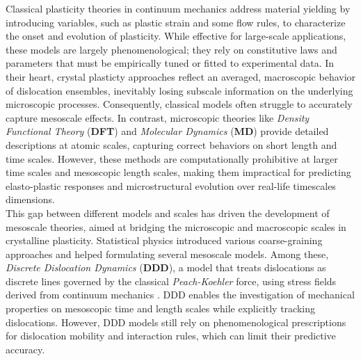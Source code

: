 \documentclass[11pt]{article}
\begin{document}
Classical plasticity theories in continuum mechanics address material yielding by introducing variables, such as plastic strain and some flow rules, to characterize the onset and evolution of plasticity. While effective for large-scale applications, these models are largely phenomenological; they rely on constitutive laws and parameters that must be empirically tuned or fitted to experimental data. In their heart, crystal plasticty approaches reflect an averaged, macroscopic behavior of dislocation ensembles, inevitably losing subscale information on the underlying microscopic processes. Consequently, classical models often struggle to accurately capture mesoscale effects. In contrast, microscopic theories like \emph{Density Functional Theory} (\textbf{DFT}) \parencite{woodwardPredictionDislocation2008} and \emph{Molecular Dynamics} (\textbf{MD}) \parencite{zhouLargescalemolecular1998} provide detailed descriptions at atomic scales, capturing correct behaviors on short length and time scales. However, these methods are computationally prohibitive at larger time scales and mesoscopic length scales, making them impractical for predicting elasto-plastic responses and microstructural evolution over real-life timescales dimensions.\\
This gap between different models and scales has driven the development of mesoscale theories, aimed at bridging the microscopic and macroscopic scales in crystalline plasticity. Statistical physics introduced various coarse-graining approaches and helped formulating several mesoscale models. Among these, \emph{Discrete Dislocation Dynamics} (\textbf{DDD}), a model that treats dislocations as discrete lines governed by the classical \emph{Peach-Koehler} force, using stress fields derived from continuum mechanics \parencite{devincreThreeDimensionalSimulations1992}. DDD enables the investigation of mechanical properties on mesoscopic time and length scales while explicitly tracking dislocations. However, DDD models still rely on phenomenological prescriptions for dislocation mobility and interaction rules, which can limit their predictive accuracy.\\
\end{document}
